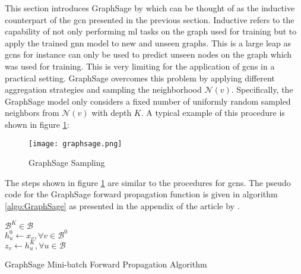 	\noindent This section introduces GraphSage by \cite{hamilton2017inductive} 
	which can be thought of as the inductive counterpart of the \acs{gcn} 
	presented in the previous section. Inductive refers to the capability of 
	not only performing \acs{ml} tasks on the graph used for training but to 
	apply the trained \acs{gnn} model to new and unseen graphs. This is a large 
	leap as \acsp{gcn} for instance can only be used to predict unseen nodes on 
	the graph which was used for training. This is very limiting for the 
	application of \acsp{gcn} in a practical setting. GraphSage overcomes this
	problem by applying different aggregation strategies and sampling the 
	neighborhood $\mathcal{N}(v)$. Specifically, the GraphSage model only 
	considers a fixed number of uniformly random sampled neighbors from 
	$\mathcal{N}(v)$ with depth $K$. A typical example of this procedure is 
	shown in figure \ref{fig:GraphSage_sample}:

	\begin{figure}[h]
		\centering
		\texttt{[image: graphsage.png]}
		\caption{GraphSage Sampling}
		\cite[p. 2]{hamilton2017inductive}
		\label{fig:GraphSage_sample}
	\end{figure}

	\noindent The steps shown in figure \ref{fig:GraphSage_sample} are similar
	to the procedures for \acsp{gcn}. The pseudo code for the GraphSage forward 
	propagation function is given in algorithm \ref{algo:GraphSage} as
	presented in the appendix of the article by
	\citeauthor{hamilton2017inductive} \citeyearpar[p. 12]{hamilton2017inductive}. \\


	\begin{algorithm}[h]
		\scriptsize
		\SetAlgoLined
		\nl $\mathcal{B}^{K}\in\mathcal{B}$\\
		\nl {}
		\nl $h_{u}^{0}\leftarrow x_{v},\forall v \in \mathcal{B}^{0}$\\
		\nl {}
		\nl $z_v \leftarrow h_{u}^{K},\forall u \in \mathcal{B}$
		\caption{GraphSage Mini-batch Forward Propagation Algorithm}
		\label{algo:GraphSage}
	\end{algorithm}
	
